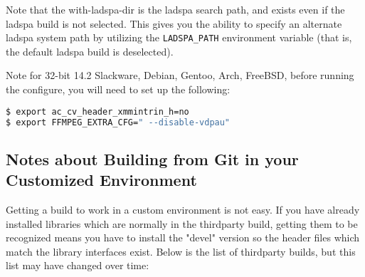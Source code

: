 Note that the with-ladspa-dir is the ladspa search path, and exists even if the ladspa build is not selected.  This gives you the ability to specify an alternate ladspa system path by utilizing the \texttt{LADSPA\_PATH} environment variable (that is, the default ladspa build is deselected).

Note for 32-bit 14.2 Slackware, Debian, Gentoo, Arch, FreeBSD, before running the configure, you will need to set up the following:

\begin{lstlisting}[language=bash]
$ export ac_cv_header_xmmintrin_h=no
$ export FFMPEG_EXTRA_CFG=" --disable-vdpau"
\end{lstlisting}

\subsection{Notes about Building from Git in your Customized Environment}%
\label{sub:notes_about_building_from_git_in_your_customized_environment}

Getting a build to work in a custom environment is not easy.  If you have already installed libraries which are normally in the thirdparty build, getting them to be recognized means you have to install the "devel" version so the header files which match the library interfaces exist.  Below is the list of thirdparty builds, but this list may have changed over time:

